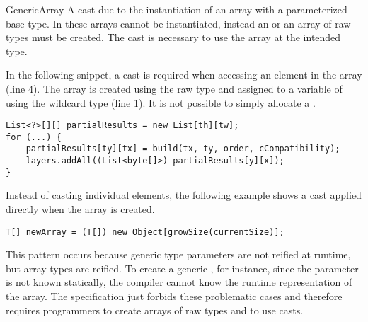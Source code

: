 \begin{pattern}{GenericArray}
A cast due to the instantiation of an array with a parameterized base type.
  In \java{} these arrays cannot be instantiated, instead an 
  or an array of raw types must be created.
  The cast is necessary to use the array at the intended type. 

\instances{}
In the following snippet,%
\def\urlvar{http://bit.ly/ppiastucki_recast4j_2EM7zWK}
a cast is required when accessing an element in the array (line 4).
  The array is created using the raw type 
  and assigned to a variable of using the wildcard type 
  (line 1).
  It is not possible to simply allocate a .

\begin{verbatim}
List<?>[][] partialResults = new List[th][tw];
for (...) {
    partialResults[ty][tx] = build(tx, ty, order, cCompatibility);
    layers.addAll((List<byte[]>) partialResults[y][x]);
}
\end{verbatim}

Instead of casting individual elements,
the following example%
\def\urlvar{http://bit.ly/seven332_Nimingban_2UdBwIL}
shows a cast applied directly when the array is created. 

\begin{verbatim}
T[] newArray = (T[]) new Object[growSize(currentSize)];
\end{verbatim}


\discussion{}
This pattern occurs because generic type parameters are not reified at runtime,
but array types are reified. To create a generic , for instance, since the
  parameter  is not known statically, the compiler cannot know the
  runtime representation of the array. The \java{} specification just forbids
  these problematic cases and therefore requires programmers to create
  arrays of raw types and to use casts.

\end{pattern}
